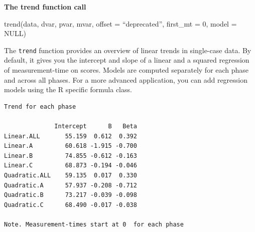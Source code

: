 \documentclass[
  letterpaper,
  DIV=11,
  numbers=noendperiod]{scrreprt}
\newenvironment{Shaded}{\begin{snugshade}}{\end{snugshade}}
\newcommand{\AttributeTok}[1]{\textcolor[rgb]{0.40,0.45,0.13}{#1}}
\newcommand{\CommentTok}[1]{\textcolor[rgb]{0.37,0.37,0.37}{#1}}
\newcommand{\DecValTok}[1]{\textcolor[rgb]{0.68,0.00,0.00}{#1}}
\newcommand{\FunctionTok}[1]{\textcolor[rgb]{0.28,0.35,0.67}{#1}}
\newcommand{\NormalTok}[1]{\textcolor[rgb]{0.00,0.23,0.31}{#1}}
\newcommand{\OtherTok}[1]{\textcolor[rgb]{0.00,0.23,0.31}{#1}}
\newcommand{\SpecialCharTok}[1]{\textcolor[rgb]{0.37,0.37,0.37}{#1}}
\newcommand{\StringTok}[1]{\textcolor[rgb]{0.13,0.47,0.30}{#1}}
\begin{document}
\begin{tcolorbox}[enhanced jigsaw, breakable, rightrule=.15mm, bottomrule=.15mm, arc=.35mm, colback=white, colframe=quarto-callout-tip-color-frame, opacityback=0, leftrule=.75mm, toprule=.15mm, left=2mm]
\begin{minipage}[t]{5.5mm}
\textcolor{quarto-callout-tip-color}{\faLightbulb}
\end{minipage}%
\begin{minipage}[t]{\textwidth - 5.5mm}

\textbf{The trend function call}\vspace{2mm}

trend(data, dvar, pvar, mvar, offset = ``deprecated'', first\_mt = 0,
model = NULL)

\end{minipage}%
\end{tcolorbox}

The \texttt{trend} function provides an overview of linear trends in
single-case data. By default, it gives you the intercept and slope of a
linear and a squared regression of measurement-time on scores. Models
are computed separately for each phase and across all phases. For a more
advanced application, you can add regression models using the R specific
formula class.

\begin{Shaded}
\end{Shaded}

\begin{verbatim}
Trend for each phase

              Intercept      B   Beta
Linear.ALL       55.159  0.612  0.392
Linear.A         60.618 -1.915 -0.700
Linear.B         74.855 -0.612 -0.163
Linear.C         68.873 -0.194 -0.046
Quadratic.ALL    59.135  0.017  0.330
Quadratic.A      57.937 -0.208 -0.712
Quadratic.B      73.217 -0.039 -0.098
Quadratic.C      68.490 -0.017 -0.038

Note. Measurement-times start at 0  for each phase
\end{verbatim}

\begin{Shaded}
\end{Shaded}
\end{document}
